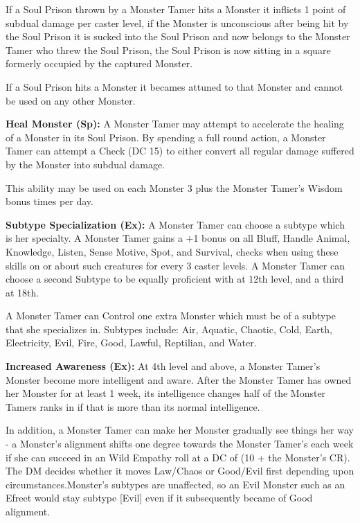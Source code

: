 If a Soul Prison thrown by a Monster Tamer hits a Monster it inflicts 1 point of subdual damage per caster level, if the Monster is unconscious after being hit by the Soul Prison it is sucked into the Soul Prison and now belongs to the Monster Tamer who threw the Soul Prison, the Soul Prison is now sitting in a square formerly occupied by the captured Monster.

If a Soul Prison hits a Monster it becames attuned to that Monster and cannot be used on any other Monster.

\textbf{Heal Monster (Sp):} A Monster Tamer may attempt to accelerate the healing of a Monster in its Soul Prison. By spending a full round action, a Monster Tamer can attempt a  Check (DC 15) to either convert all regular damage suffered by the Monster into subdual damage.

This ability may be used on each Monster 3 plus the Monster Tamer's Wisdom bonus times per day.

\textbf{Subtype Specialization (Ex):} A Monster Tamer can choose a subtype which is her specialty. A Monster Tamer gains a +1 bonus on
all Bluff, Handle Animal, Knowledge, Listen, Sense Motive, Spot, and Survival, checks when using these skills on
or about such creatures for every 3 caster levels. A Monster Tamer can choose a second Subtype to be equally proficient with at 12th level, and a third at 18th.

A Monster Tamer can Control one extra Monster which must be of a subtype that she specializes in. Subtypes include: Air, Aquatic, Chaotic, Cold, Earth, Electricity, Evil, Fire, Good, Lawful, Reptilian, and Water.

\textbf{Increased Awareness (Ex):} At 4th level and above, a Monster Tamer's Monster become more intelligent and aware. After the
Monster Tamer has owned her Monster for at least 1 week, its intelligence changes half of the Monster Tamers ranks in  if that is more than its normal intelligence.

In addition, a Monster Tamer can make her Monster gradually see things her way - a Monster's alignment shifts one degree towards the Monster Tamer's each week if she can succeed in an Wild Empathy roll at a DC of (10 + the Monster's CR). The DM decides whether it moves Law/Chaos or Good/Evil first depending upon circumstances.Monster's subtypes are unaffected, so an Evil Monster such as an Efreet would stay subtype [Evil] even if it subsequently became of Good alignment.

